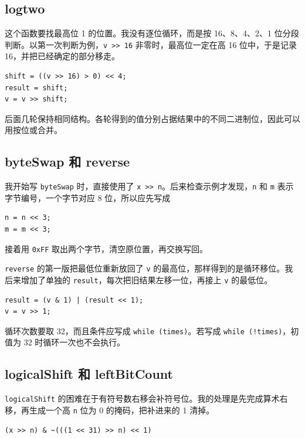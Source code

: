 \documentclass[UTF8,zihao=-4]{ctexart}
\begin{document}
\subsection{logtwo}

这个函数要找最高位 1 的位置。我没有逐位循环，而是按 16、8、4、2、1 位分段判断。以第一次判断为例，\texttt{v >> 16} 非零时，最高位一定在高 16 位中，于是记录 16，并把已经确定的部分移走。

\begin{lstlisting}
shift = ((v >> 16) > 0) << 4;
result = shift;
v = v >> shift;
\end{lstlisting}

后面几轮保持相同结构。各轮得到的值分别占据结果中的不同二进制位，因此可以用按位或合并。

\subsection{byteSwap 和 reverse}

我开始写 \texttt{byteSwap} 时，直接使用了 \texttt{x >> n}。后来检查示例才发现，\texttt{n} 和 \texttt{m} 表示字节编号，一个字节对应 8 位，所以应先写成

\begin{lstlisting}
n = n << 3;
m = m << 3;
\end{lstlisting}

接着用 \texttt{0xFF} 取出两个字节，清空原位置，再交换写回。

\texttt{reverse} 的第一版把最低位重新放回了 \texttt{v} 的最高位，那样得到的是循环移位。我后来增加了单独的 \texttt{result}，每次把旧结果左移一位，再接上 \texttt{v} 的最低位。

\begin{lstlisting}
result = (v & 1) | (result << 1);
v = v >> 1;
\end{lstlisting}

循环次数要取 32，而且条件应写成 \texttt{while (times)}。若写成 \texttt{while (!times)}，初值为 32 时循环一次也不会执行。

\subsection{logicalShift 和 leftBitCount}

\texttt{logicalShift} 的困难在于有符号数右移会补符号位。我的处理是先完成算术右移，再生成一个高 \texttt{n} 位为 0 的掩码，把补进来的 1 清掉。

\begin{lstlisting}
(x >> n) & ~(((1 << 31) >> n) << 1)
\end{lstlisting}
\end{document}
